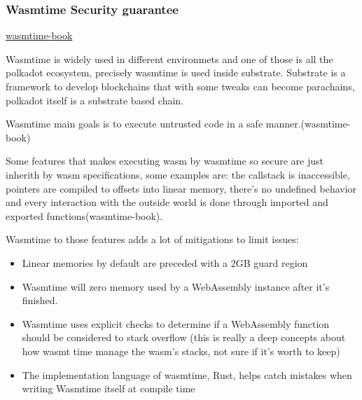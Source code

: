 \documentclass[../main.tex]{subfiles}
\begin{document}
\subsubsection{Wasmtime Security guarantee}
\href{https://docs.wasmtime.dev/}{wasmtime-book}

Wasmtime is widely used in different environmets and one of those is all the polkadot ecosystem, precisely wasmtime is used inside substrate. Substrate is a framework to develop blockchains that with some tweaks can become parachains, polkadot itself is a substrate based chain.

Wasmtime main goals is to execute untrusted code in a safe manner.(wasmtime-book)

Some features that makes executing wasm by wasmtime so secure are just inherith by wasm specifications, some examples are: the callstack is inaccessible, pointers are compiled to offsets into linear memory, there's no undefined behavior and every interaction with the outside world is done through imported and exported functions(wasmtime-book).

Wasmtime to those features adds a lot of mitigations to limit issues:
\begin{itemize}
  \item Linear memories by default are preceded with a 2GB guard region
  \item Wasmtime will zero memory used by a WebAssembly instance after it's finished.
  \item Wasmtime uses explicit checks to determine if a WebAssembly function should be considered to stack overflow (this is really a deep concepts about how wasmt time manage the wasm's stacks, not sure if it's worth to keep)
  \item The implementation language of wasmtime, Rust, helps catch mistakes when writing Wasmtime itself at compile time
\end{itemize}
\end{document}
